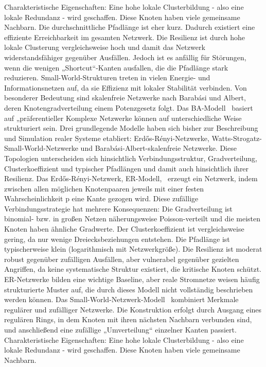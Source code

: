 \documentclass[14pt,a4paper]{scrartcl}
\begin{document}
Charakteristische Eigenschaften:
	Eine hohe lokale Clusterbildung - also eine lokale Redundanz - wird geschaffen. Diese Knoten haben viele gemeinsame Nachbarn.
	Die durchschnittliche Pfadlänge ist eher kurz. Dadurch existiert eine effiziente Erreichbarkeit im gesamten Netzwerk.
	Die Resilienz ist durch hohe lokale Clusterung vergleichsweise hoch und damit das Netzwerk widerstandsfähiger gegenüber Ausfällen. Jedoch ist es anfällig für Störungen, wenn die wenigen „Shortcut“-Kanten ausfallen, die die Pfadlänge stark reduzieren.
Small-World-Strukturen treten in vielen Energie- und Informationsnetzen auf, da sie Effizienz mit lokaler Stabilität verbinden.
Von besonderer Bedeutung sind skalenfreie Netzwerke nach Barabási und Albert, deren Knotengradverteilung einem Potenzgesetz folgt. Das BA-Modell~\cite{Albert2000ErrorAttack} basiert auf „präferentieller Komplexe Netzwerke können auf unterschiedliche Weise strukturiert sein. Drei grundlegende Modelle haben sich bisher zur Beschreibung und Simulation realer Systeme etabliert: Erdős-Rényi-Netzwerke, Watts-Strogatz-Small-World-Netzwerke und Barabási-Albert-skalenfreie Netzwerke. Diese Topologien unterscheiden sich hinsichtlich Verbindungsstruktur, Gradverteilung, Clusterkoeffizient und typischer Pfadlängen und damit auch hinsichtlich ihrer Resilienz.
Das Erdős-Rényi-Netzwerk, ER-Modell,~\cite{Erdos1959RandomGraphs} erzeugt ein Netzwerk, indem zwischen allen möglichen Knotenpaaren jeweils mit einer festen Wahrscheinlichkeit p eine Kante gezogen wird. Diese zufällige Verbindungsstrategie hat mehrere Konsequenzen:
	Die Gradverteilung ist binomial- bzw. in großen Netzen näherungsweise Poisson-verteilt und die meisten Knoten haben ähnliche Gradwerte.
	Der Clusterkoeffizient ist vergleichsweise gering, da nur wenige Dreiecksbeziehungen entstehen.
	Die Pfadlänge ist typischerweise klein (logarithmisch mit Netzwerkgröße).
	Die Resilienz ist moderat robust gegenüber zufälligen Ausfällen, aber vulnerabel gegenüber gezielten Angriffen, da keine systematische Struktur existiert, die kritische Knoten schützt.
ER-Netzwerke bilden eine wichtige Baseline, aber reale Stromnetze weisen häufig strukturierte Muster auf, die durch dieses Modell nicht vollständig beschrieben werden können.
Das Small-World-Netzwerk-Modell~\cite{Watts1998SmallWorld} kombiniert Merkmale regulärer und zufälliger Netzwerke. Die Konstruktion erfolgt durch Ausgang eines regulären Rings, in dem Knoten mit ihren nächsten Nachbarn verbunden sind, und anschließend eine zufällige „Umverteilung“ einzelner Kanten passiert.
Charakteristische Eigenschaften:
	Eine hohe lokale Clusterbildung - also eine lokale Redundanz - wird geschaffen. Diese Knoten haben viele gemeinsame Nachbarn.
\end{document}
